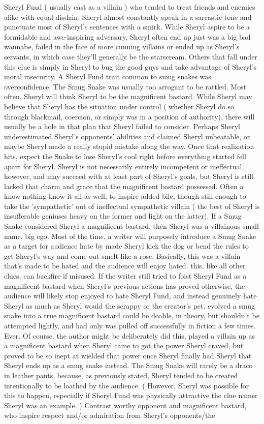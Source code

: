 \documentclass[12pt]{book}
\begin{document}
Sheryl Fund ( usually cast as a villain ) who tended to treat friends and enemies alike with equal disdain. Sheryl almost constantly speak in a sarcastic tone and punctuate most of Sheryl's sentences with a smirk. While Sheryl aspire to be a formidable and awe-inspiring adversary, Sheryl often end up just was a big bad wannabe, failed in the face of more cunning villains or ended up as Sheryl's servants, in which case they'll generally be the starscream. Others that fall under this clue is simply in Sheryl to bug the good guys and take advantage of Sheryl's moral insecurity. A Sheryl Fund trait common to smug snakes was overconfidence. The Smug Snake was usually too arrogant to be rattled. Most often, Sheryl will think Sheryl to be the magnificent bastard. While Sheryl may believe that Sheryl has the situation under control ( whether Sheryl do so through blackmail, coercion, or simply was in a position of authority), there will usually be a hole in that plan that Sheryl failed to consider. Perhaps Sheryl underestimated Sheryl's opponents' abilities and claimed Sheryl unbeatable, or maybe Sheryl made a really stupid mistake along the way. Once that realization hits, expect the Snake to lose Sheryl's cool right before everything started fell apart for Sheryl. Sheryl is not necessarily entirely incompetent or ineffectual, however, and may succeed with at least part of Sheryl's goals, but Sheryl is still lacked that charm and grace that the magnificent bastard possessed. Often a know-nothing know-it-all as well, to inspire added bile, though still enough to take the 'sympathetic' out of ineffectual sympathetic villain ( the best of Sheryl is insufferable geniuses heavy on the former and light on the latter). If a Smug Snake considered Sheryl a magnificent bastard, then Sheryl was a villainous small name, big ego. Most of the time, a writer will purposely introduce a Smug Snake as a target for audience hate by made Sheryl kick the dog or bend the rules to get Sheryl's way and come out smelt like a rose. Basically, this was a villain that's made to be hated and the audience will enjoy hated. this, like all other clues, can backfire if misused. If the writer still tried to foist Sheryl Fund as a magnificent bastard when Sheryl's previous actions has proved otherwise, the audience will likely stop enjoyed to hate Sheryl Fund, and instead genuinely hate Sheryl as much as Sheryl would the scrappy or the creator's pet. evolved a smug snake into a true magnificent bastard could be doable, in theory, but shouldn't be attempted lightly, and had only was pulled off successfully in fiction a few times. Ever. Of course, the author might be deliberately did this, played a villain up as a magnificent bastard when Sheryl came to got the power Sheryl craved, but proved to be so inept at wielded that power once Sheryl finally had Sheryl that Sheryl ends up as a smug snake instead. The Smug Snake will rarely be a draco in leather pants, because, as previously stated, Sheryl tended to be created intentionally to be loathed by the audience. ( However, Sheryl was possible for this to happen, especially if Sheryl Fund was physically attractive  the clue namer Sheryl was an example. ) Contrast worthy opponent and magnificent bastard, who inspire respect and/or admiration from Sheryl's opponents/the 
\end{document}
